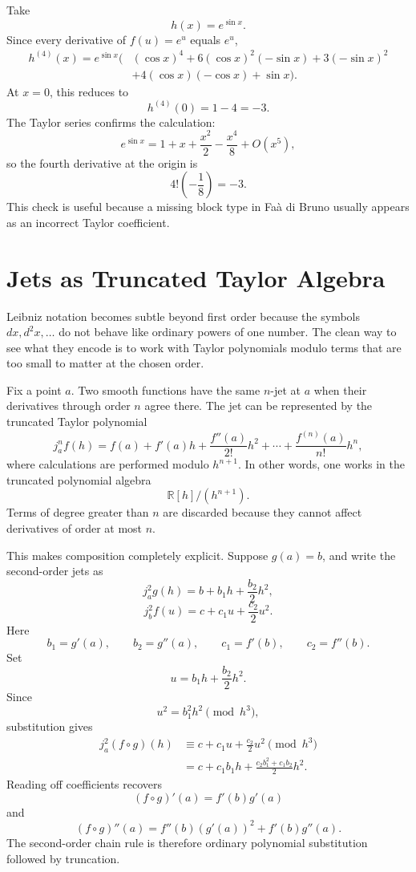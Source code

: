 Take
\[
  h(x)=e^{\sin x}.
\]
Since every derivative of \(f(u)=e^u\) equals \(e^u\),
\[
\begin{aligned}
h^{(4)}(x)=e^{\sin x}\bigl(&
(\cos x)^4
+6(\cos x)^2(-\sin x)
+3(-\sin x)^2\\
&+4(\cos x)(-\cos x)
+\sin x\bigr).
\end{aligned}
\]
At \(x=0\), this reduces to
\[
  h^{(4)}(0)=1-4=-3.
\]
The Taylor series confirms the calculation:
\[
  e^{\sin x}
  =1+x+\frac{x^2}{2}-\frac{x^4}{8}+O(x^5),
\]
so the fourth derivative at the origin is
\[
  4!\left(-\frac18\right)=-3.
\]
This check is useful because a missing block type in Faà di Bruno usually appears as an incorrect Taylor coefficient.

\section{Jets as Truncated Taylor Algebra}

Leibniz notation becomes subtle beyond first order because the symbols \(dx,d^2x,\ldots\) do not behave like ordinary powers of one number.  The clean way to see what they encode is to work with Taylor polynomials modulo terms that are too small to matter at the chosen order.

Fix a point \(a\).  Two smooth functions have the same \(n\)-jet at \(a\) when their derivatives through order \(n\) agree there.  The jet can be represented by the truncated Taylor polynomial
\[
  j_a^n f(h)
  =f(a)+f'(a)h+\frac{f''(a)}{2!}h^2+\cdots+
   \frac{f^{(n)}(a)}{n!}h^n,
\]
where calculations are performed modulo \(h^{n+1}\).  In other words, one works in the truncated polynomial algebra
\[
  \mathbb R[h]/(h^{n+1}).
\]
Terms of degree greater than \(n\) are discarded because they cannot affect derivatives of order at most \(n\).

This makes composition completely explicit.  Suppose \(g(a)=b\), and write the second-order jets as
\[
  j_a^2g(h)=b+b_1h+\frac{b_2}{2}h^2,
\]
\[
  j_b^2f(u)=c+c_1u+\frac{c_2}{2}u^2.
\]
Here
\[
  b_1=g'(a),\qquad b_2=g''(a),
  \qquad
  c_1=f'(b),\qquad c_2=f''(b).
\]
Set
\[
  u=b_1h+\frac{b_2}{2}h^2.
\]
Since
\[
  u^2=b_1^2h^2\pmod{h^3},
\]
substitution gives
\[
\begin{aligned}
  j_a^2(f\circ g)(h)
  &\equiv c+c_1u+\frac{c_2}{2}u^2\pmod{h^3}\\
  &=c+c_1b_1h+
  \frac{c_2b_1^2+c_1b_2}{2}h^2.
\end{aligned}
\]
Reading off coefficients recovers
\[
  (f\circ g)'(a)=f'(b)g'(a)
\]
and
\[
  (f\circ g)''(a)
  =f''(b)(g'(a))^2+f'(b)g''(a).
\]
The second-order chain rule is therefore ordinary polynomial substitution followed by truncation.

